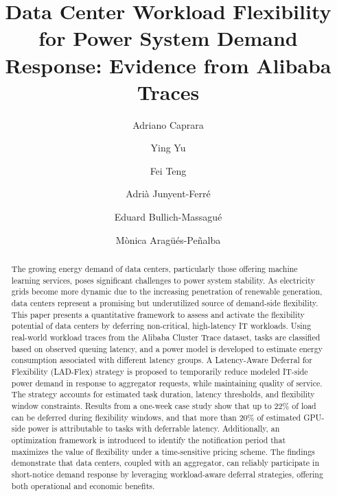 \documentclass[preprint,12pt]{elsarticle}
\begin{document}
\begin{frontmatter}

\title{Data Center Workload Flexibility for Power System Demand Response: Evidence from Alibaba Traces} %

\author[1]{Adriano Caprara}

\author[2]{Ying Yu}

\author[2]{Fei Teng}

\author[2]{Adri\`{a} Junyent-Ferr\'{e}}

\author[1]{Eduard Bullich-Massagué}

\author[1]{M\`{o}nica Arag\"{u}\'{e}s-Pe\~{n}alba}





\begin{abstract}
The growing energy demand of data centers, particularly those offering machine learning services, poses significant challenges to power system stability. As electricity grids become more dynamic due to the increasing penetration of renewable generation, data centers represent a promising but underutilized source of demand-side flexibility. This paper presents a quantitative framework to assess and activate the flexibility potential of data centers by deferring non-critical, high-latency IT workloads. Using real-world workload traces from the Alibaba Cluster Trace dataset, tasks are classified based on observed queuing latency, and a power model is developed to estimate energy consumption associated with different latency groups. A Latency-Aware Deferral for Flexibility (LAD-Flex) strategy is proposed to temporarily reduce modeled IT-side power demand in response to aggregator requests, while maintaining quality of service. The strategy accounts for estimated task duration, latency thresholds, and flexibility window constraints. Results from a one-week case study show that up to 22\% of load can be deferred during flexibility windows, and that more than 20\% of estimated GPU-side power is attributable to tasks with deferrable latency. Additionally, an optimization framework is introduced to identify the notification period that maximizes the value of flexibility under a time-sensitive pricing scheme. The findings demonstrate that data centers, coupled with an aggregator, can reliably participate in short-notice demand response by leveraging workload-aware deferral strategies, offering both operational and economic benefits.
\end{abstract}


\end{frontmatter}
\end{document}
